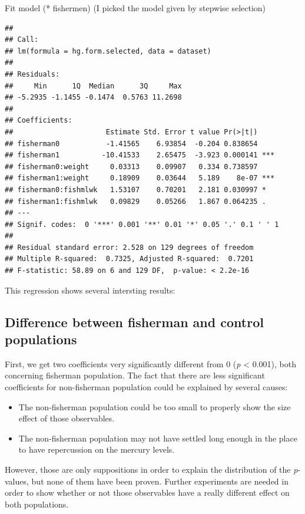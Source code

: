 \documentclass[12pt,]{article}
\providecommand{\tightlist}{%
  \setlength{\itemsep}{0pt}\setlength{\parskip}{0pt}}
\begin{document}
Fit model (* fishermen) (I picked the model given by stepwise selection)

\begin{verbatim}
## 
## Call:
## lm(formula = hg.form.selected, data = dataset)
## 
## Residuals:
##     Min      1Q  Median      3Q     Max 
## -5.2935 -1.1455 -0.1474  0.5763 11.2698 
## 
## Coefficients:
##                      Estimate Std. Error t value Pr(>|t|)    
## fisherman0           -1.41565    6.93854  -0.204 0.838654    
## fisherman1          -10.41533    2.65475  -3.923 0.000141 ***
## fisherman0:weight     0.03313    0.09907   0.334 0.738597    
## fisherman1:weight     0.18909    0.03644   5.189    8e-07 ***
## fisherman0:fishmlwk   1.53107    0.70201   2.181 0.030997 *  
## fisherman1:fishmlwk   0.09829    0.05266   1.867 0.064235 .  
## ---
## Signif. codes:  0 '***' 0.001 '**' 0.01 '*' 0.05 '.' 0.1 ' ' 1
## 
## Residual standard error: 2.528 on 129 degrees of freedom
## Multiple R-squared:  0.7325, Adjusted R-squared:  0.7201 
## F-statistic: 58.89 on 6 and 129 DF,  p-value: < 2.2e-16
\end{verbatim}

This regression shows several intersting results:

\subsection{Difference between fisherman and control
populations}\label{difference-between-fisherman-and-control-populations}

First, we get two coefficients very significantly different from 0
(\emph{p} \textless{} 0.001), both concerning fisherman population. The
fact that there are less significant coefficients for non-fisherman
population could be explained by several causes:

\begin{itemize}
\tightlist
\item
  The non-fisherman population could be too small to properly show the
  size effect of those observables.
\item
  The non-fisherman population may not have settled long enough in the
  place to have repercussion on the mercury levels.
\end{itemize}

However, those are only suppositions in order to explain the
distribution of the \emph{p}-values, but none of them have been proven.
Further experiments are needed in order to show whether or not those
observables have a really different effect on both populations.
\end{document}
